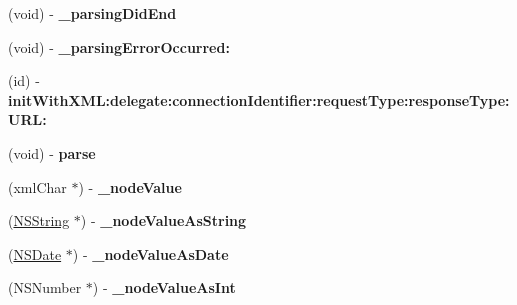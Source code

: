 \begin{DoxyCompactItemize}
\item 
\hypertarget{interface_m_g_twitter_lib_x_m_l_parser_a02eebd16b0614f05dc0039c370b6e69c}{
(void) -\/ {\bfseries \-\_\-parsing\-Did\-End}}
\label{interface_m_g_twitter_lib_x_m_l_parser_a02eebd16b0614f05dc0039c370b6e69c}

\item 
\hypertarget{interface_m_g_twitter_lib_x_m_l_parser_a9f2db40c3543e2e02f095d8af1a4001a}{
(void) -\/ {\bfseries \-\_\-parsing\-Error\-Occurred\-:}}
\label{interface_m_g_twitter_lib_x_m_l_parser_a9f2db40c3543e2e02f095d8af1a4001a}

\item 
\hypertarget{interface_m_g_twitter_lib_x_m_l_parser_acc0666cd7ace21f35d0a1be69354f527}{
(id) -\/ {\bfseries init\-With\-X\-M\-L\-:delegate\-:connection\-Identifier\-:request\-Type\-:response\-Type\-:\-U\-R\-L\-:}}
\label{interface_m_g_twitter_lib_x_m_l_parser_acc0666cd7ace21f35d0a1be69354f527}

\item 
\hypertarget{interface_m_g_twitter_lib_x_m_l_parser_a8868f9b8f95ee8ee3d23655e331ef0a2}{
(void) -\/ {\bfseries parse}}
\label{interface_m_g_twitter_lib_x_m_l_parser_a8868f9b8f95ee8ee3d23655e331ef0a2}

\item 
\hypertarget{interface_m_g_twitter_lib_x_m_l_parser_a2f58b5a732f5380f2eea2810271546f3}{
(xml\-Char $\ast$) -\/ {\bfseries \-\_\-node\-Value}}
\label{interface_m_g_twitter_lib_x_m_l_parser_a2f58b5a732f5380f2eea2810271546f3}

\item 
\hypertarget{interface_m_g_twitter_lib_x_m_l_parser_abbf55407236cb146e6bce1ca1b664072}{
(\hyperlink{class_n_s_string}{\-N\-S\-String} $\ast$) -\/ {\bfseries \-\_\-node\-Value\-As\-String}}
\label{interface_m_g_twitter_lib_x_m_l_parser_abbf55407236cb146e6bce1ca1b664072}

\item 
\hypertarget{interface_m_g_twitter_lib_x_m_l_parser_af936b9cc2cde33e169ed960f44ecc21a}{
(\hyperlink{class_n_s_date}{\-N\-S\-Date} $\ast$) -\/ {\bfseries \-\_\-node\-Value\-As\-Date}}
\label{interface_m_g_twitter_lib_x_m_l_parser_af936b9cc2cde33e169ed960f44ecc21a}

\item 
\hypertarget{interface_m_g_twitter_lib_x_m_l_parser_ab6aff756b11021887c06ef5d4b38421d}{
(\-N\-S\-Number $\ast$) -\/ {\bfseries \-\_\-node\-Value\-As\-Int}}
\label{interface_m_g_twitter_lib_x_m_l_parser_ab6aff756b11021887c06ef5d4b38421d}


\end{DoxyCompactItemize}
